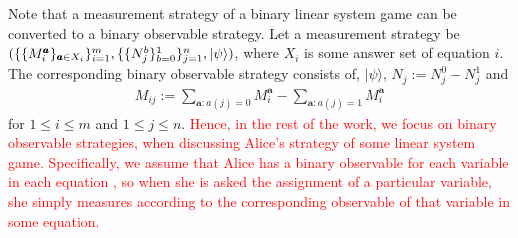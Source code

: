 \documentclass[11pt,letterpaper]{article}
\newcommand{\ket}[1]{|#1\rangle}
\newcommand{\1}{\mathbb{1}}
\newcommand{\ba}{\pmb{a}}
\newcommand{\hf}[1]{\textcolor{red}{#1}}
\theoremstyle{definition}
\begin{document}
Note that a measurement strategy of a binary linear system game can be converted to a binary observable strategy. Let a measurement strategy be 
$(\{\{M_i^{\ba}\}_{\ba \in X_i}\}_{i=1}^m, \{\{N_j^b\}_{b=0}^1\}_{j=1}^n,\\ \ket{\psi})$, where $X_i$ is some answer set of equation $i$.
The corresponding binary observable
strategy consists of, $\ket{\psi}$, $N_j := N_j^0 - N_j^1$ and
\begin{align*}
    M_{ij} := \sum_{\ba: a(j)=0} M_i^{\ba} - \sum_{\ba: a(j) =1}
    M_i^{\ba}
\end{align*}
for $1\leq i \leq m$ and $1 \leq j \leq n$. 
\hf{
Hence, in the rest of the work, we focus on binary observable strategies,
when discussing Alice's strategy of some linear system game.
Specifically, we assume that Alice has a binary observable for each variable
in each equation ,
so when she is asked the assignment of a particular variable, she simply
measures according to the corresponding observable of that variable in some equation.}

\end{document}
